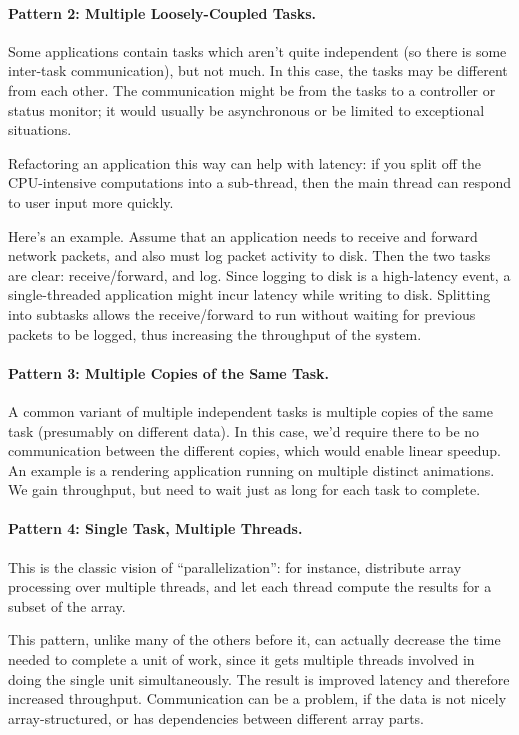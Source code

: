 \documentclass[a4paper]{report}
\begin{document}
\paragraph{Pattern 2: Multiple Loosely-Coupled Tasks.} Some applications contain
tasks which aren't quite independent (so there is some inter-task
communication), but not much.  In this case, the tasks may be
different from each other. The communication might be from the tasks
to a controller or status monitor; it would usually be asynchronous or
be limited to exceptional situations.

Refactoring an application this way can help with latency: if you 
split off the CPU-intensive computations into a sub-thread, then
the main thread can respond to user input more quickly.

Here's an example. Assume that an application needs to receive and
forward network packets, and also must log packet activity to disk.
Then the two tasks are clear: receive/forward, and log. Since logging
to disk is a high-latency event, a single-threaded application might
incur latency while writing to disk. Splitting into subtasks allows
the receive/forward to run without waiting for previous packets to be
logged, thus increasing the throughput of the system.

\paragraph{Pattern 3: Multiple Copies of the Same Task.} A common variant of
multiple independent tasks is multiple copies of the same task
(presumably on different data). In this case, we'd require there to be
no communication between the different copies, which would enable
linear speedup. An example is a rendering application running on
multiple distinct animations. We gain throughput, but need to wait
just as long for each task to complete.

\paragraph{Pattern 4: Single Task, Multiple Threads.} This is the classic
vision of ``parallelization'': for instance, distribute array
processing over multiple threads, and let each thread compute the
results for a subset of the array.

This pattern, unlike many of the others before it, can actually
decrease the time needed to complete a unit of work, since it gets
multiple threads involved in doing the single unit simultaneously.
The result is improved latency and therefore increased throughput.
Communication can be a problem, if the data is not nicely
array-structured, or has dependencies between different array parts.
\end{document}
